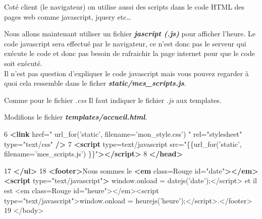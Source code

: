 \documentclass{article}
\newenvironment{Shaded}{}{}
\newcommand{\KeywordTok}[1]{\textcolor[rgb]{0.00,0.44,0.13}{\textbf{{#1}}}}
\newcommand{\DecValTok}[1]{\textcolor[rgb]{0.25,0.63,0.44}{{#1}}}
\newcommand{\StringTok}[1]{\textcolor[rgb]{0.25,0.44,0.63}{{#1}}}
\newcommand{\OtherTok}[1]{\textcolor[rgb]{0.00,0.44,0.13}{{#1}}}
\newcommand{\FunctionTok}[1]{\textcolor[rgb]{0.02,0.16,0.49}{{#1}}}
\newcommand{\NormalTok}[1]{{#1}}
\begin{document}
Coté client (le navigateur) on utilise aussi des scripts dans le code
HTML des pages web comme javascript, jquery etc\ldots{}

Nous allons maintenant utiliser un fichier \textbf{\emph{jascript
(.js)}} pour afficher l'heure. Le code javascript sera effectué par le
navigateur, ce n'est donc pas le serveur qui exécute le code et donc pas
besoin de rafraichir la page internet pour que le code soit exécuté.\\Il
n'est pas question d'expliquer le code javascript mais vous pouvez
regarder à quoi cela ressemble dans le ficher
\textbf{\emph{static/mes\_scripts.js}}.

Comme pour le fichier \emph{.css} Il faut indiquer le fichier \emph{.js}
aux templates.

Modifions le fichier \textbf{\emph{templates/accueil.html}}.

\begin{Shaded}
\begin{Highlighting}[]
 \NormalTok{6 }\KeywordTok{<link}\OtherTok{ href=}\StringTok{" url_for('static', filename='mon_style.css') "}\OtherTok{ rel=}\StringTok{"stylesheet"}\OtherTok{ type=}\StringTok{"text/css"} \KeywordTok{/>}
 \NormalTok{7 }\KeywordTok{<script}\OtherTok{ type=}\StringTok{text/javascript}\OtherTok{ src=}\StringTok{"\{\{url_for('static', filename='mes_scripts.js') \}\}"}\KeywordTok{></script>}
 \NormalTok{8 }\KeywordTok{</head>}
\end{Highlighting}
\end{Shaded}

\begin{Shaded}
\begin{Highlighting}[]
\NormalTok{17 }\KeywordTok{</ul>}
\NormalTok{18 }\KeywordTok{<footer>}\NormalTok{Nous sommes le }\KeywordTok{<em}\OtherTok{ class=}\StringTok{Rouge}\OtherTok{ id=}\StringTok{"date"}\KeywordTok{></em>} \KeywordTok{<script}\OtherTok{ type=}\StringTok{"text/javascript"}\KeywordTok{>} \OtherTok{window}\NormalTok{.}\FunctionTok{onload} \NormalTok{= }\FunctionTok{datejs}\NormalTok{(}\StringTok{'date'}\NormalTok{);<}\OtherTok{/script> et il est <em class=Rouge id="heure"></em}\NormalTok{><script type=}\StringTok{"text/javascript"}\NormalTok{>}\OtherTok{window}\NormalTok{.}\FunctionTok{onload} \NormalTok{= }\FunctionTok{heurejs}\NormalTok{(}\StringTok{'heure'}\NormalTok{);<}\OtherTok{/script>.</footer}\NormalTok{>}
\DecValTok{19} \NormalTok{<}\OtherTok{/body>}
\end{Highlighting}
\end{Shaded}
\end{document}
